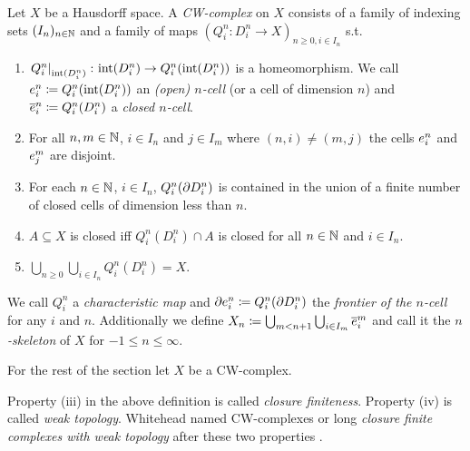 \begin{defi}\label{defi:CWComplex2}
    Let $X$ be a Hausdorff space.
    A \emph{CW-complex} on $X$ consists of a family of indexing sets $(I_n)_{n \in \bN}$ and a family of maps $(Q_i^n\colon D_i^n\rightarrow X)_{n \ge 0, i \in I_n}$ s.t.
    \begin{enumerate}
        \item $\restrict{Q_i^n}{\interior{D_i^n}}\colon \interior{D_i^n} \rightarrow Q_i^n(\interior{D_i^n})$ is a homeomorphism. We call $\openCell{n}{i} \coloneq Q_i^n(\interior{D_i^n})$ an \emph{(open) $n$-cell} (or a cell of dimension $n$) and $\closedCell{n}{i} \coloneq Q_i^n(D_i^n)$ a \emph{closed $n$-cell}.
        \item For all $n, m \in \bN$, $i \in I_n$ and $j \in I_m$ where $(n, i) \ne (m, j)$ the cells $\openCell{n}{i}$ and $\openCell{m}{j}$ are disjoint.
        \item For each $n \in \bN$, $i \in I_n$, $Q_i^n(\boundary D_i^n)$ is contained in the union of a finite number of closed cells of dimension less than $n$.
        \item $A \subseteq X$ is closed iff $Q_i^n(D_i^n) \cap A$ is closed for all $n \in \bN$ and $i \in I_n$.
        \item $\bigcup_{n \ge 0}\bigcup_{i \in I_n} Q_i^n(D_i^n) = X$.
    \end{enumerate}
    We call $Q_i^n$ a \emph{characteristic map} and $\cellFrontier{n}{i} \coloneq Q_i^n(\boundary D_i^n)$ the \emph{frontier of the $n$-cell} for any $i$ and $n$.
    Additionally we define $X_n \coloneq \bigcup_{m < n + 1} \bigcup_{i \in I_m} \closedCell{m}{i}$ and call it the \emph{$n$-skeleton} of $X$ for $-1 \le n \le \infty$.
\end{defi}


For the rest of the section let $X$ be a CW-complex.

\begin{rem}
    Property (iii) in the above definition is called \emph{closure finiteness}.
    Property (iv) is called \emph{weak topology}.
    Whitehead named CW-complexes or long \emph{closure finite complexes with weak topology} after these two properties \cite{Whitehead2018}.
\end{rem}

